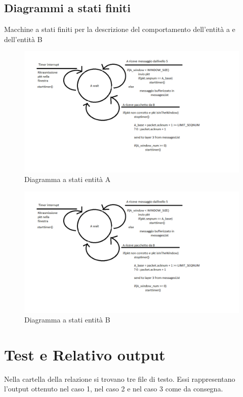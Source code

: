 \documentclass[a4paper]{article}
\begin{document}
\subsection{Diagrammi a stati finiti}
Macchine a stati finiti per la descrizione del comportamento dell'entità a e dell'entità B
\begin{figure}[h!]
\includegraphics[scale = 0.50]{Assigment3.png}
\caption{Diagramma a stati entità A}
\end{figure}
\newline
\begin{figure}[h!]
\includegraphics[scale = 0.50]{Assigment3.png}
\caption{Diagramma a stati entità B}
\end{figure}

\section{Test e Relativo output}
Nella cartella della relazione si trovano tre file di testo. Essi rappresentano l'output ottenuto nel caso 1, nel caso 2 e nel caso 3 come da consegna.
\end{document}
